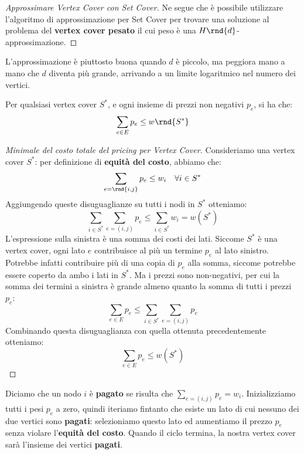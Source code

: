 \documentclass[\main/main.tex]{subfiles}
\begin{document}
\begin{multicols}{2}
\begin{proof}[Approssimare Vertex Cover con Set Cover]
    Ne segue che è possibile utilizzare l'algoritmo di approssimazione per Set Cover per trovare una soluzione al problema del \textbf{vertex cover pesato} il cui peso è una \(H\rnd{d}\)-approssimazione.
\end{proof}
\begin{observation}
    L'approssimazione è piuttosto buona quando \(d\) è piccolo, ma peggiora mano a mano che \(d\) diventa più grande, arrivando a un limite logaritmico nel numero dei vertici.
\end{observation}
\vfill\null
\columnbreak
\begin{lemma}
    Per qualsiasi vertex cover \(S^*\), e ogni insieme di prezzi non negativi \(p_e\), si ha che:
    \[
        \sum_{e \in E} p_e \leq w\rnd{S^*}
    \]
\end{lemma}
\begin{proof}[Minimale del costo totale del pricing per Vertex Cover]
    Consideriamo una vertex cover \(S^*\): per definizione di \textbf{equità del costo}, abbiamo che:
    \[
        \sum_{e = \rnd{i,j}} p_e \leq w_i \quad \forall i \in S^*
    \]
    Aggiungendo queste disuguaglianze su tutti i nodi in \(S^*\) otteniamo:
    \[
        \sum_{i \in S^{*}} \sum_{e=(i, j)} p_{e} \leq \sum_{i \in S^{*}} w_{i}=w\left(S^{*}\right)
    \]
    L'espressione sulla sinistra è una somma dei costi dei lati. Siccome \(S^*\) è una vertex cover, ogni lato \(e\) contribuisce al più un termine \(p_e\) al lato sinistro. Potrebbe infatti contribuire più di una copia di \(p_e\) alla somma, siccome potrebbe essere coperto da ambo i lati in \(S^*\). Ma i prezzi sono non-negativi, per cui la somma dei termini a sinistra è grande almeno quanto la somma di tutti i prezzi \(p_e\):
    \[
        \sum_{e \in E} p_{e} \leq \sum_{i \in S^{*}} \sum_{e=(i, j)} p_{e}
    \]
    Combinando questa disuguaglianza con quella ottenuta precedentemente otteniamo:
    \[
        \sum_{e \in E} p_{e} \leq w\left(S^{*}\right)
    \]
\end{proof}
\begin{definition}
    Diciamo che un nodo \(i\) è \textbf{pagato} se risulta che \(\sum_{e=(i, j)} p_{e}=w_{i}\). Inizializziamo tutti i pesi \(p_e\) a zero, quindi iteriamo fintanto che esiste un lato di cui nessuno dei due vertici sono \textbf{pagati}: selezioniamo questo lato ed aumentiamo il prezzo \(p_e\) senza violare l'\textbf{equità del costo}. Quando il ciclo termina, la nostra vertex cover sarà l'insieme dei vertici \textbf{pagati}. 

\end{definition}
\end{multicols}
\end{document}
